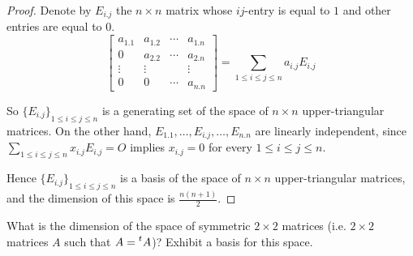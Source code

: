 \begin{proof}
    Denote by $E_{i.j}$ the $n\times n$ matrix whose $ij$-entry is equal to $1$ and other entries are equal to $0$.
    \[
        \begin{bmatrix}
            a_{1.1} & a_{1.2} & \cdots & a_{1.n} \\
            0       & a_{2.2} & \cdots & a_{2.n} \\
            \vdots  & \vdots  &        & \vdots  \\
            0       & 0       & \cdots & a_{n.n}
        \end{bmatrix}
        = \sum_{1\le i \le j \le n} a_{i.j}E_{i.j}
    \]

    So ${\{ E_{i.j} \}}_{1\le i \le j \le n}$ is a generating set of the space of $n\times n$ upper-triangular matrices. On the other hand, $E_{1.1}, \ldots, E_{i.j}, \ldots, E_{n.n}$ are linearly independent, since $\sum_{1\le i\le j\le n}x_{i.j}E_{i.j} = O$ implies $x_{i.j} = 0$ for every $1\le i\le j\le n$.

    Hence ${\{ E_{i.j} \}}_{1\le i \le j \le n}$ is a basis of the space of $n\times n$ upper-triangular matrices, and the dimension of this space is $\frac{n(n+1)}{2}$.
\end{proof}

\begin{exercise}
    What is the dimension of the space of symmetric $2\times 2$ matrices (i.e. $2\times 2$ matrices $A$ such that $A = \prescript{t}{}{A}$)? Exhibit a basis for this space.
\end{exercise}

